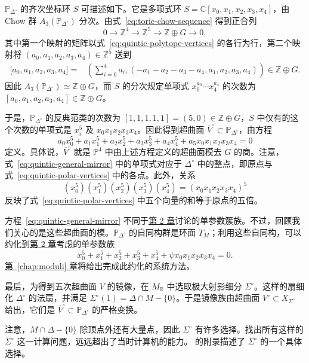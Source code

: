 $\mathbb P_{\Delta^\circ}$ 的齐次坐标环 $S$ 可描述如下。它是多项式环 $S=\mathbb C[x_0,x_1,x_2,x_3,x_4]$，由 Chow 群 $A_3(\mathbb P_{\Delta^\circ})$ 分次。由式~\eqref{eq:toric-chow-sequence} 得到正合列
\[
0\longrightarrow\mathbb Z^4\longrightarrow\mathbb Z^5
\longrightarrow\mathbb Z\oplus G\longrightarrow0,
\]
其中第一个映射的矩阵以式~\eqref{eq:quintic-polytope-vertices} 的各行为行，第二个映射将 $(a_0,a_1,a_2,a_3,a_4)\in\mathbb Z^5$ 送到
\[
\begin{aligned}
\bigl[a_0,a_1,a_2,a_3,a_4\bigr]
={}&\left(\sum_{i=0}^4a_i,
(-a_1-a_2-a_3-a_4,a_1,a_2,a_3,a_4)\right)\!\in\mathbb Z\oplus G.
\end{aligned}
\]
因此 $A_3(\mathbb P_{\Delta^\circ})\simeq\mathbb Z\oplus G$，而 $S$ 的分次规定单项式 $x_0^{a_0}\cdots x_4^{a_4}$ 的次数为 $[a_0,a_1,a_2,a_3,a_4]\in\mathbb Z\oplus G$。

于是，$\mathbb P_{\Delta^\circ}$ 的反典范类的次数为 $[1,1,1,1,1]=(5,0)\in\mathbb Z\oplus G$，$S$ 中仅有的这个次数的单项式是 $x_i^5$ 及 $x_0x_1x_2x_3x_4$。因此得到超曲面 $\overline V^\circ\subset\mathbb P_{\Delta^\circ}$，由方程
\begin{equation}\label{eq:quintic-general-mirror}
a_0x_0^5+a_1x_1^5+a_2x_2^5+a_3x_3^5+a_4x_4^5
+a_5x_0x_1x_2x_3x_4=0
\end{equation}
定义。具体说，$\overline V^\circ$ 就是 $\mathbb P^4$ 中由上述方程定义的超曲面模去 $G$ 的商。注意，式~\eqref{eq:quintic-general-mirror} 中的单项式对应于 $\Delta^\circ$ 中的整点，即原点与式~\eqref{eq:quintic-polar-vertices} 中的各点。此外，关系
\[
(x_0^5)(x_1^5)(x_2^5)(x_3^5)(x_4^5)
=(x_0x_1x_2x_3x_4)^5
\]
反映了式~\eqref{eq:quintic-polar-vertices} 中五个向量的和等于原点的五倍。

方程~\eqref{eq:quintic-general-mirror} 不同于\hyperref[chap:quintic]{第 2 章}讨论的单参数簇族。不过，回顾我们关心的是这些超曲面的模。$\mathbb P_{\Delta^\circ}$ 的自同构群是环面 $T_M$；利用这些自同构，可以约化到\hyperref[chap:quintic]{第 2 章}考虑的单参数族
\[
x_0^5+x_1^5+x_2^5+x_3^5+x_4^5+\psi x_0x_1x_2x_3x_4=0.
\]
\hyperref[chap:moduli]{第~\ref*{chap:moduli} 章}将给出完成此约化的系统方法。

最后，为得到五次超曲面 $V$ 的镜像，在 $M_{\mathbb R}$ 中选取极大射影细分 $\Sigma^\circ$。这样的扇细化 $\Delta^\circ$ 的法扇，并满足 $\Sigma^\circ(1)=\Delta\cap M-\{0\}$。于是镜像族由超曲面 $V^\circ\subset X_{\Sigma^\circ}$ 给出，它们是 $\overline V^\circ\subset\mathbb P_{\Delta^\circ}$ 的严格变换。

注意，$M\cap\Delta-\{0\}$ 除顶点外还有大量点，因此 $\Sigma^\circ$ 有许多选择。找出所有这样的 $\Sigma^\circ$ 这一计算问题，远远超出了当时计算机的能力。 的附录描述了 $\Sigma^\circ$ 的一个具体选择。

